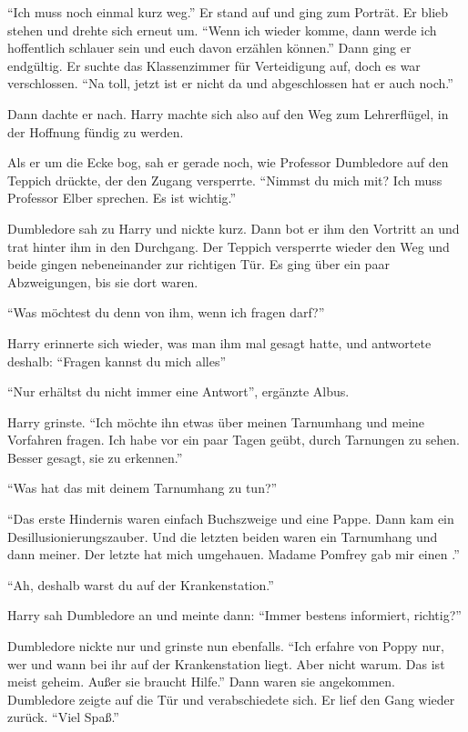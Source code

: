 \enquote{Ich muss noch einmal kurz weg.} Er stand auf und ging zum Porträt. Er blieb stehen und drehte sich erneut um. \enquote{Wenn ich wieder komme, dann werde ich hoffentlich schlauer sein und euch davon erzählen können.} Dann ging er endgültig. Er suchte das Klassenzimmer für Verteidigung auf, doch es war verschlossen. \enquote{Na toll, jetzt ist er nicht da und abgeschlossen hat er auch noch.}

Dann dachte er nach.  Harry machte sich also auf den Weg zum Lehrerflügel, in der Hoffnung fündig zu werden.

Als er um die Ecke bog, sah er gerade noch, wie Professor Dumbledore auf den Teppich drückte, der den Zugang versperrte. \enquote{Nimmst du mich mit? Ich muss Professor Elber sprechen. Es ist wichtig.}

Dumbledore sah zu Harry und nickte kurz. Dann bot er ihm den Vortritt an und trat hinter ihm in den Durchgang. Der Teppich versperrte wieder den Weg und beide gingen nebeneinander zur richtigen Tür. Es ging über ein paar Abzweigungen, bis sie dort waren.

\enquote{Was möchtest du denn von ihm, wenn ich fragen darf?}

Harry erinnerte sich wieder, was man ihm mal gesagt hatte, und antwortete deshalb: \enquote{Fragen kannst du mich alles\abs}

\enquote{Nur erhältst du nicht immer eine Antwort}, ergänzte Albus.

Harry grinste. \enquote{Ich möchte ihn etwas über meinen Tarnumhang und meine Vorfahren fragen. Ich habe vor ein paar Tagen geübt, durch Tarnungen zu sehen. Besser gesagt, sie zu erkennen.}

\enquote{Was hat das mit deinem Tarnumhang zu tun?}

\enquote{Das erste Hindernis waren einfach Buchszweige und eine Pappe. Dann kam ein Desillusionierungszauber. Und die letzten beiden waren ein Tarnumhang und dann meiner. Der letzte hat mich umgehauen. Madame Pomfrey gab mir einen .}

\enquote{Ah, deshalb warst du auf der Krankenstation.}

Harry sah Dumbledore an und meinte dann: \enquote{Immer bestens informiert, richtig?}

Dumbledore nickte nur und grinste nun ebenfalls. \enquote{Ich erfahre von Poppy nur, wer und wann bei ihr auf der Krankenstation liegt. Aber nicht warum. Das ist meist geheim. Außer sie braucht Hilfe.} Dann waren sie angekommen. Dumbledore zeigte auf die Tür und verabschiedete sich. Er lief den Gang wieder zurück. \enquote{Viel Spaß.}

